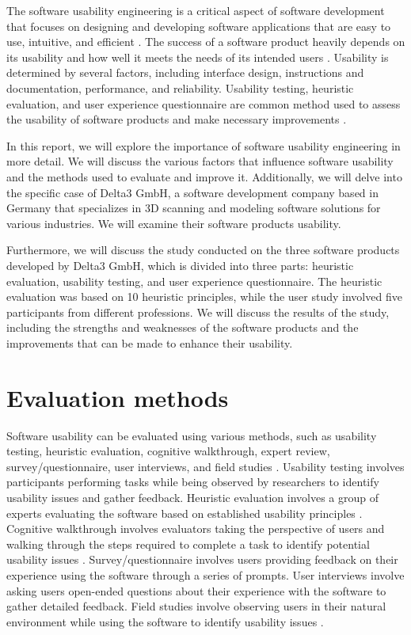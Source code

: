 \documentclass[conference,onecolumn]{IEEEtran}
\begin{document}
	The software usability engineering is a critical aspect of software development that focuses on designing and developing software applications that are easy to use, intuitive, and efficient \cite{dillon2001evaluation}. The success of a software product heavily depends on its usability and how well it meets the needs of its intended users \cite{berkman2016re}. Usability is determined by several factors, including interface design, instructions and documentation, performance, and reliability. Usability testing, heuristic evaluation, and user experience questionnaire are common method used to assess the usability of software products and make necessary improvements \cite{sagar2017systematic}.

	In this report, we will explore the importance of software usability engineering in more detail. We will discuss the various factors that influence software usability and the methods used to evaluate and improve it. Additionally, we will delve into the specific case of Delta3 GmbH, a software development company based in Germany that specializes in 3D scanning and modeling software solutions for various industries. We will examine their software products usability.

	Furthermore, we will discuss the study conducted on the three software products developed by Delta3 GmbH, which is divided into three parts: heuristic evaluation, usability testing,  and user experience questionnaire. The heuristic evaluation was based on 10 heuristic principles, while the user study involved five participants from different professions. We will discuss the results of the study, including the strengths and weaknesses of the software products and the improvements that can be made to enhance their usability.

\section{Evaluation methods}

    Software usability can be evaluated using various methods, such as usability testing, heuristic evaluation, cognitive walkthrough, expert review, survey/questionnaire, user interviews, and field studies \cite{sauro2012standardized}. Usability testing involves participants performing tasks while being observed by researchers to identify usability issues and gather feedback. Heuristic evaluation involves a group of experts evaluating the software based on established usability principles \cite{rubin2008handbook}. Cognitive walkthrough involves evaluators taking the perspective of users and walking through the steps required to complete a task to identify potential usability issues \cite{albert2013measuring}. Survey/questionnaire involves users providing feedback on their experience using the software through a series of prompts. User interviews involve asking users open-ended questions about their experience with the software to gather detailed feedback. Field studies involve observing users in their natural environment while using the software to identify usability issues \cite{sauro2016quantifying}.
\end{document}
